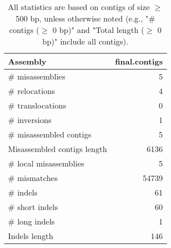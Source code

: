 \documentclass[12pt,a4paper]{article}
\begin{document}
\begin{table}[ht]
\begin{center}
\caption{All statistics are based on contigs of size $\geq$ 500 bp, unless otherwise noted (e.g., "\# contigs ($\geq$ 0 bp)" and "Total length ($\geq$ 0 bp)" include all contigs).}
\begin{tabular}{|l*{1}{|r}|}
\hline
Assembly & final.contigs \\ \hline
\# misassemblies & 5 \\ \hline
\hspace{5mm}\# relocations & 4 \\ \hline
\hspace{5mm}\# translocations & 0 \\ \hline
\hspace{5mm}\# inversions & 1 \\ \hline
\# misassembled contigs & 5 \\ \hline
Misassembled contigs length & 6136 \\ \hline
\# local misassemblies & 5 \\ \hline
\# mismatches & 54739 \\ \hline
\# indels & 61 \\ \hline
\hspace{5mm}\# short indels & 60 \\ \hline
\hspace{5mm}\# long indels & 1 \\ \hline
Indels length & 146 \\ \hline
\end{tabular}
\end{center}
\end{table}
\end{document}
